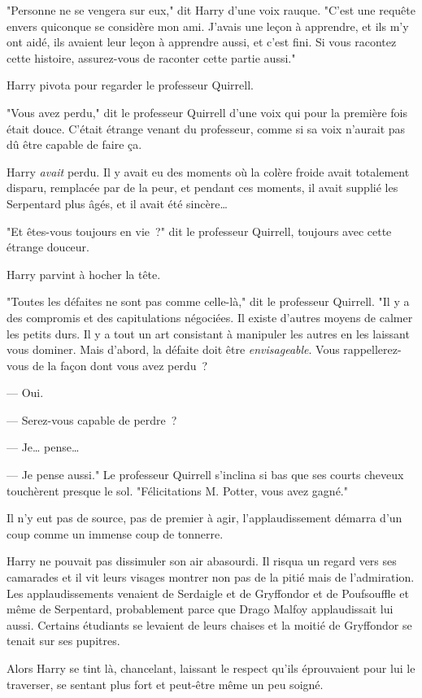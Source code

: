 "Personne ne se vengera sur eux," dit Harry d'une voix rauque. "C'est une requête envers quiconque se considère mon ami. J'avais une leçon à apprendre, et ils m'y ont aidé, ils avaient leur leçon à apprendre aussi, et c'est fini. Si vous racontez cette histoire, assurez-vous de raconter cette partie aussi."

Harry pivota pour regarder le professeur Quirrell.

"Vous avez perdu," dit le professeur Quirrell d'une voix qui pour la première fois était douce. C'était étrange venant du professeur, comme si sa voix n'aurait pas dû être capable de faire ça.

Harry \emph{avait} perdu. Il y avait eu des moments où la colère froide avait totalement disparu, remplacée par de la peur, et pendant ces moments, il avait supplié les Serpentard plus âgés, et il avait été sincère…

"Et êtes-vous toujours en vie~?" dit le professeur Quirrell, toujours avec cette étrange douceur.

Harry parvint à hocher la tête.

"Toutes les défaites ne sont pas comme celle-là," dit le professeur Quirrell. "Il y a des compromis et des capitulations négociées. Il existe d'autres moyens de calmer les petits durs. Il y a tout un art consistant à manipuler les autres en les laissant vous dominer. Mais d'abord, la défaite doit être \emph{envisageable}. Vous rappellerez-vous de la façon dont vous avez perdu~?

--- Oui.

--- Serez-vous capable de perdre~?

--- Je… pense…

--- Je pense aussi." Le professeur Quirrell s'inclina si bas que ses courts cheveux touchèrent presque le sol. "Félicitations M. Potter, vous avez gagné."

Il n'y eut pas de source, pas de premier à agir, l'applaudissement démarra d'un coup comme un immense coup de tonnerre.

Harry ne pouvait pas dissimuler son air abasourdi. Il risqua un regard vers ses camarades et il vit leurs visages montrer non pas de la pitié mais de l'admiration. Les applaudissements venaient de Serdaigle et de Gryffondor et de Poufsouffle et même de Serpentard, probablement parce que Drago Malfoy applaudissait lui aussi. Certains étudiants se levaient de leurs chaises et la moitié de Gryffondor se tenait sur ses pupitres.

Alors Harry se tint là, chancelant, laissant le respect qu'ils éprouvaient pour lui le traverser, se sentant plus fort et peut-être même un peu soigné.

